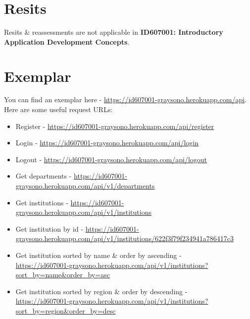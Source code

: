 \documentclass{article}
\begin{document}
\section*{Resits}
Resits \& reassessments are not applicable in \textbf{ID607001: Introductory Application Development Concepts}.

\newpage

\section*{Exemplar}
You can find an exemplar here - \small\href{https://id607001-graysono.herokuapp.com/api/v1}{https://id607001-graysono.herokuapp.com/api}. \\

Here are some useful request URLs:
\begin{itemize}
	\item Register - \href{https://id607001-graysono.herokuapp.com/api/register}{https://id607001-graysono.herokuapp.com/api/register}
	\item Login - \href{https://id607001-graysono.herokuapp.com/api/login}{https://id607001-graysono.herokuapp.com/api/login}
	\item Logout - \href{https://id607001-graysono.herokuapp.com/api/logout}{https://id607001-graysono.herokuapp.com/api/logout}
	\item Get departments - \href{https://id607001-graysono.herokuapp.com/api/v1/departments}{https://id607001-graysono.herokuapp.com/api/v1/departments}
	\item Get institutions - \href{https://id607001-graysono.herokuapp.com/api/v1/institutions}{https://id607001-graysono.herokuapp.com/api/v1/institutions}
	\item Get institution by id - \href{https://id607001-graysono.herokuapp.com/api/v1/institutions/622f3f79f234941a786417c3}{https://id607001-graysono.herokuapp.com/api/v1/institutions/622f3f79f234941a786417c3}
	\item Get institution sorted by name \& order by ascending - \\ \href{https://id607001-graysono.herokuapp.com/api/v1/institutions?sort\_by=name\&order\_by=asc}{https://id607001-graysono.herokuapp.com/api/v1/institutions?sort\_by=name\&order\_by=asc}
	\item Get institution sorted by region \& order by descending - \\ \href{https://id607001-graysono.herokuapp.com/api/v1/institutions?sort\_by=region\&order\_by=desc}{https://id607001-graysono.herokuapp.com/api/v1/institutions?sort\_by=region\&order\_by=desc}

\end{itemize}
\end{document}
